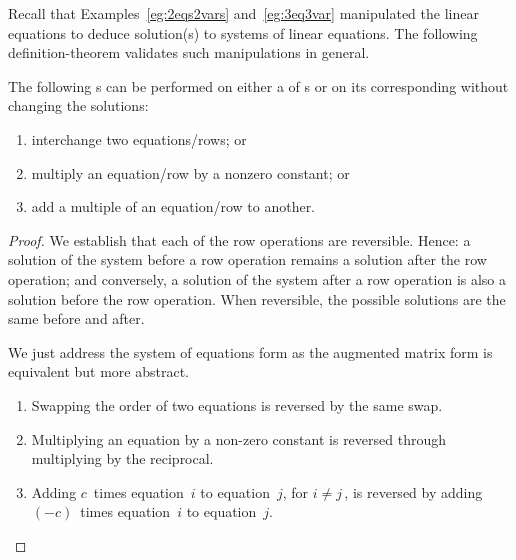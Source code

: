 Recall that Examples~\ref{eg:2eqs2vars} and~\ref{eg:3eq3var} manipulated the linear equations to deduce solution(s) to systems of linear equations.
The following definition-theorem validates such manipulations in general. 


\begin{theorem} \label{thm:erowop} 
The following s can be performed on either a  of s or on its corresponding  without changing the solutions:
\begin{enumerate}
\item {}interchange two equations\slash rows; or
\item multiply an equation\slash row by a nonzero constant; or
\item add a multiple of an equation\slash row to another.
\end{enumerate}
\end{theorem}

\begin{comment}
Interestingly, some other texts omit a proof that row operations preserve the solution(s).  Poole comments on reversibility.  Larson comments that row operations produce `equivalent' systems, but does not prove.  
\end{comment}

\begin{proof} 
We establish that each of the row operations are reversible. 
Hence: a solution of the system before a row operation remains a solution after the row operation; and conversely, a solution of the system after a row operation is also a solution before the row operation.
When reversible, the possible solutions are the same before and after.

We just address the system of equations form as the augmented matrix form is equivalent but more abstract.
\begin{enumerate}
\item Swapping the order of two equations is reversed by the same swap.
\item Multiplying an equation by a non-zero constant is reversed through multiplying by the reciprocal.
\item Adding \(c\)~times equation~\(i\) to equation~\(j\), for \(i\neq j\)\,, is reversed by adding \((-c)\)~times  equation~\(i\) to equation~\(j\).
\end{enumerate}
\end{proof}



